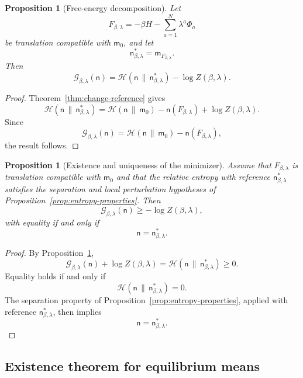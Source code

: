 \documentclass[11pt,reqno]{amsart}
\newtheorem{Proposition}[Theorem]{Proposition}
\begin{document}
\begin{Proposition}[Free-energy decomposition]
\label{cor:free-energy-decomposition}
Let
\[
F_{\beta,\lambda}
=
-\beta H-\sum_{a=1}^{N}\lambda^a\Phi_a
\]
be translation compatible with $\mathsf m_0$, and let
\[
\mathsf n_{\beta,\lambda}^*
=
\mathsf m_{F_{\beta,\lambda}}.
\]
Then
\[
\boxed{
\mathcal G_{\beta,\lambda}(\mathsf n)
=
\mathcal H(
\mathsf n\,\|\,\mathsf n_{\beta,\lambda}^*
)
-
\log Z(\beta,\lambda).
}
\]
\end{Proposition}

\begin{proof}
Theorem~\ref{thm:change-reference} gives
\[
\mathcal H(
\mathsf n\,\|\,\mathsf n_{\beta,\lambda}^*
)
=
\mathcal H(\mathsf n\,\|\,\mathsf m_0)
-
\mathsf n(F_{\beta,\lambda})
+
\log Z(\beta,\lambda).
\]
Since
\[
\mathcal G_{\beta,\lambda}(\mathsf n)
=
\mathcal H(\mathsf n\,\|\,\mathsf m_0)
-
\mathsf n(F_{\beta,\lambda}),
\]
the result follows.
\end{proof}

\begin{Proposition}[Existence and uniqueness of the minimizer]
\label{cor:change-reference-minimizer}
Assume that $F_{\beta,\lambda}$ is translation compatible with
$\mathsf m_0$ and that the relative entropy with reference
$\mathsf n_{\beta,\lambda}^*$ satisfies the separation and local
perturbation hypotheses of
Proposition~\ref{prop:entropy-properties}. Then
\[
\mathcal G_{\beta,\lambda}(\mathsf n)
\geq
-\log Z(\beta,\lambda),
\]
with equality if and only if
\[
\mathsf n=\mathsf n_{\beta,\lambda}^*.
\]
\end{Proposition}

\begin{proof}
By Proposition~\ref{cor:free-energy-decomposition},
\[
\mathcal G_{\beta,\lambda}(\mathsf n)
+
\log Z(\beta,\lambda)
=
\mathcal H(
\mathsf n\,\|\,\mathsf n_{\beta,\lambda}^*
)
\geq 0.
\]
Equality holds if and only if
\[
\mathcal H(
\mathsf n\,\|\,\mathsf n_{\beta,\lambda}^*
)=0.
\]
The separation property of
Proposition~\ref{prop:entropy-properties}, applied with reference
$\mathsf n_{\beta,\lambda}^*$, then implies
\[
\mathsf n=\mathsf n_{\beta,\lambda}^*.
\]
\end{proof}

\subsection{Existence theorem for equilibrium means}
\end{document}
